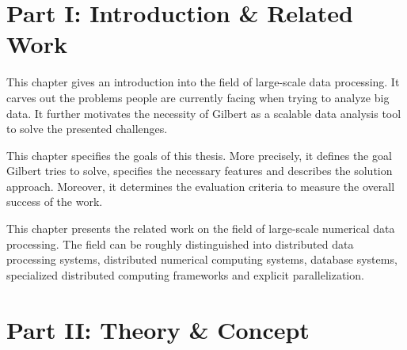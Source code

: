 \clearemptydoublepage

{}

\thispagestyle{empty}

\begin{center}
\end{center}

\section*{Part I: Introduction \& Related Work}

\vspace{3mm}


\noindent This chapter gives an introduction into the field of large-scale data processing. 
It carves out the problems people are currently facing when trying to analyze big data. 
It further motivates the necessity of Gilbert as a scalable data analysis tool to solve the presented challenges.

\vspace{3mm}


\noindent This chapter specifies the goals of this thesis. 
More precisely, it defines the goal Gilbert tries to solve, specifies the necessary features and describes the solution approach. 
Moreover, it determines the evaluation criteria to measure the overall success of the work.

\vspace{3mm}


\noindent This chapter presents the related work on the field of large-scale numerical data processing. 
The field can be roughly distinguished into distributed data processing systems, distributed numerical computing systems, database systems, specialized distributed computing frameworks and explicit parallelization.

\vspace{3mm}

\section*{Part II: Theory \& Concept}

\vspace{3mm}

